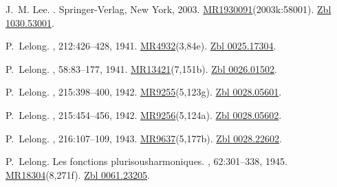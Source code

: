 \documentclass[11pt,a4paper, final, twoside]{article}
\numberwithin{equation}{section}
\begin{document}
\begin{appendices}
\begin{thebibliography}{100}
J.~M. Lee.
.
\newblock Springer-Verlag, New York, 2003.
\newblock
  \href{http://www.ams.org/mathscinet-getitem?mr=1930091}{MR1930091}(2003k:58001).
  \href{http://zbmath.org/?q=an:1030.53001}{Zbl 1030.53001}.

P.~Lelong.
, 212:426--428, 1941.
\newblock \href{http://www.ams.org/mathscinet-getitem?mr=4932}{MR4932}(3,84e).
  \href{http://zbmath.org/?q=an:0025.17304}{Zbl 0025.17304}.

P.~Lelong.
, 58:83--177, 1941.
\newblock
  \href{http://www.ams.org/mathscinet-getitem?mr=13421}{MR13421}(7,151b).
  \href{http://zbmath.org/?q=an:0026.01502}{Zbl 0026.01502}.

P.~Lelong.
, 215:398--400, 1942.
\newblock \href{http://www.ams.org/mathscinet-getitem?mr=9255}{MR9255}(5,123g).
  \href{http://zbmath.org/?q=an:0028.05601}{Zbl 0028.05601}.

P.~Lelong.
, 215:454--456, 1942.
\newblock \href{http://www.ams.org/mathscinet-getitem?mr=9256}{MR9256}(5,124a).
  \href{http://zbmath.org/?q=an:0028.05602}{Zbl 0028.05602}.

P.~Lelong.
, 216:107--109, 1943.
\newblock \href{http://www.ams.org/mathscinet-getitem?mr=9637}{MR9637}(5,177b).
  \href{http://zbmath.org/?q=an:0028.22602}{Zbl 0028.22602}.

P.~Lelong.
\newblock Les fonctions plurisousharmoniques.
, 62:301--338, 1945.
\newblock
  \href{http://www.ams.org/mathscinet-getitem?mr=18304}{MR18304}(8,271f).
  \href{http://zbmath.org/?q=an:0061.23205}{Zbl 0061.23205}.


\end{thebibliography}
\end{appendices}
\end{document}
